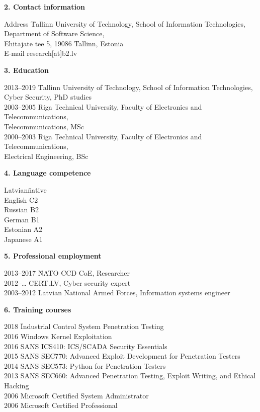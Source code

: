 \textbf{2. Contact information}
\begin{tabbing}
Address	\quad\quad 	\= Tallinn University of Technology, School of Information Technologies, \\
                        \> Department of Software Science, \\
                        \> Ehitajate tee 5, 19086 Tallinn, Estonia \\
                        E-mail\> research[at]b2.lv
\end{tabbing}

\textbf{3. Education}
\begin{tabbing}
2013--2019 \quad\quad \=Tallinn University of Technology, School of Information Technologies,\\ 
             \>Cyber Security, PhD studies \\
2003--2005	 	\>Riga Technical University, Faculty of Electronics and Telecommunications,\\ \>Telecommunications, MSc \\
2000--2003	 	\>Riga Technical University, Faculty of Electronics and Telecommunications,\\ \>Electrical Engineering, BSc \\
\end{tabbing}

\textbf{4. Language competence}
\begin{tabbing}
Latvian\quad\quad \= native\\
English	  \> C2\\
Russian   \> B2\\
German    \> B1\\
Estonian  \> A2\\
Japanese  \> A1\\
\end{tabbing}

\textbf{5. Professional employment}
\begin{tabbing}
2013--2017 \quad\quad \= NATO CCD CoE, Researcher \\
2012--\ldots \> CERT.LV, Cyber security expert\\
2003--2012   \> Latvian National Armed Forces, Information systems engineer\\
\end{tabbing}

\textbf{6. Training courses}
\begin{tabbing}
2018 \quad\quad \= Industrial Control System Penetration Testing \\
2016 \> Windows Kernel Exploitation \\
2016 \> SANS ICS410: ICS/SCADA Security Essentials \\
2015 \> SANS SEC770: Advanced Exploit Development for Penetration Testers \\
2014 \> SANS SEC573: Python for Penetration Testers \\
2013 \> SANS SEC660: Advanced Penetration Testing, Exploit Writing, and Ethical Hacking \\
2006 \> Microsoft Certified System Administrator\\
2006 \> Microsoft Certified Professional\\
\end{tabbing}

